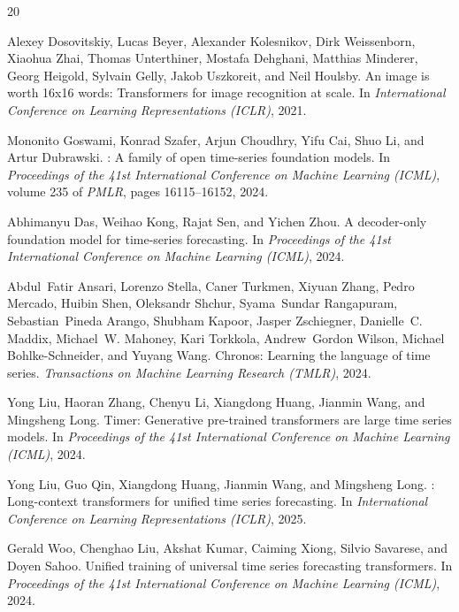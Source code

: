 \documentclass{article}
\begin{document}
\begin{thebibliography}{20}

Alexey Dosovitskiy, Lucas Beyer, Alexander Kolesnikov, Dirk Weissenborn, Xiaohua Zhai, Thomas Unterthiner, Mostafa Dehghani, Matthias Minderer, Georg Heigold, Sylvain Gelly, Jakob Uszkoreit, and Neil Houlsby.
\newblock An image is worth 16x16 words: Transformers for image recognition at scale.
\newblock In \textit{International Conference on Learning Representations (ICLR)}, 2021.

Mononito Goswami, Konrad Szafer, Arjun Choudhry, Yifu Cai, Shuo Li, and Artur Dubrawski.
: A family of open time-series foundation models.
\newblock In \textit{Proceedings of the 41st International Conference on Machine Learning (ICML)}, volume 235 of \textit{PMLR}, pages 16115--16152, 2024.

Abhimanyu Das, Weihao Kong, Rajat Sen, and Yichen Zhou.
\newblock A decoder-only foundation model for time-series forecasting.
\newblock In \textit{Proceedings of the 41st International Conference on Machine Learning (ICML)}, 2024.

Abdul~Fatir Ansari, Lorenzo Stella, Caner Turkmen, Xiyuan Zhang, Pedro Mercado, Huibin Shen, Oleksandr Shchur, Syama~Sundar Rangapuram, Sebastian~Pineda Arango, Shubham Kapoor, Jasper Zschiegner, Danielle~C. Maddix, Michael~W. Mahoney, Kari Torkkola, Andrew~Gordon Wilson, Michael Bohlke-Schneider, and Yuyang Wang.
\newblock Chronos: Learning the language of time series.
\newblock \textit{Transactions on Machine Learning Research (TMLR)}, 2024.

Yong Liu, Haoran Zhang, Chenyu Li, Xiangdong Huang, Jianmin Wang, and Mingsheng Long.
\newblock Timer: Generative pre-trained transformers are large time series models.
\newblock In \textit{Proceedings of the 41st International Conference on Machine Learning (ICML)}, 2024.

Yong Liu, Guo Qin, Xiangdong Huang, Jianmin Wang, and Mingsheng Long.
: Long-context transformers for unified time series forecasting.
\newblock In \textit{International Conference on Learning Representations (ICLR)}, 2025.

Gerald Woo, Chenghao Liu, Akshat Kumar, Caiming Xiong, Silvio Savarese, and Doyen Sahoo.
\newblock Unified training of universal time series forecasting transformers.
\newblock In \textit{Proceedings of the 41st International Conference on Machine Learning (ICML)}, 2024.


\end{thebibliography}
\end{document}
